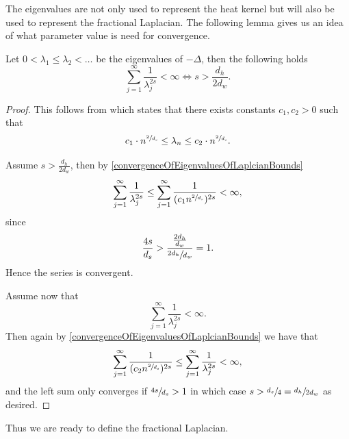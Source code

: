 The eigenvalues are not only used to represent the heat kernel but will also be used to represent the fractional Laplacian. The following lemma gives us an idea of what parameter value is need for convergence.
\begin{lemma}\label{convergenceOfEigenvaluesOfLaplacian}
	Let $0< \lambda_1 \leq \lambda_2 < \ldots$ be the eigenvalues of $-\Delta$, then the following holds
	\begin{equation}
		\sum_{j = 1}^{\infty} \frac{1}{\lambda_{j}^{2s}} < \infty \iff s > \frac{d_h}{2d_w}.
	\end{equation}
\end{lemma}
\begin{proof}
	This follows from \cite[Lemma 5.1.3]{Kigami_2001} which states that there exists constants $c_1, c_2 >0$ such that 
	\begin{equation} \label{convergenceOfEigenvaluesOfLaplcianBounds}
			c_1\cdot n^{\sfrac{2}{d_s}} \leq \lambda_{n} \leq c_2\cdot n^{\sfrac{2}{d_s}}.
	\end{equation}

	\noi Assume $s > \frac{d_h}{2d_w}$, then by \eqref{convergenceOfEigenvaluesOfLaplcianBounds}
	\begin{equation}
		\sum_{j = 1}^{\infty} \frac{1}{\lambda_j^{2s}} \leq \sum_{j = 1}^{\infty} \frac{1}{(c_1 n^{\sfrac{2}{d_s}})^{2s}} < \infty,
	\end{equation}
	since 
	\begin{equation}
		\frac{4s}{d_s} > \frac{\frac{2d_h}{d_w}}{\sfrac{2d_h}{d_w}} = 1.
	\end{equation}
	Hence the series is convergent.
	
	Assume now that 
	\begin{equation}
		\sum_{j = 1}^{\infty} \frac{1}{\lambda_{j}^{2s}} < \infty.
	\end{equation}
	Then again by \eqref{convergenceOfEigenvaluesOfLaplcianBounds} we have that
	\begin{equation}
						\sum_{j = 1}^{\infty} \frac{1}{(c_2 n^{\sfrac{2}{d_s}})^{2s}} \leq \sum_{j = 1}^{\infty} \frac{1}{\lambda_{j}^{2s}} < \infty,
	\end{equation}
	and the left sum only converges if $\sfrac{4s}{d_s} > 1$ in which case $s > \sfrac{d_s}{4} = \sfrac{d_h}{2d_w}$ as desired.
\end{proof}

Thus we are ready to define the fractional Laplacian. 

